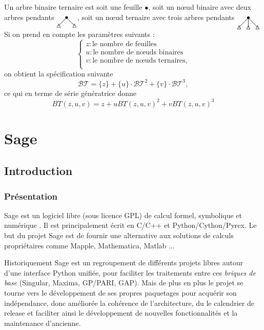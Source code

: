 \documentclass[12pt]{article}
\begin{document}
Un arbre binaire ternaire est soit une feuille $\bullet$, 
soit un nœud binaire avec deux arbres pendants $\xymatrix@R=5pt @C=5pt{& *={\bullet} \ar@{-}[dl]\ar@{-}[dr]& \\ *={\triangle}&&*={\triangle} } $,
soit un nœud ternaire avec trois arbres pendants $\xymatrix@R=10pt @C=10pt{& *={\bullet} \ar@{-}[dl]\ar@{-}[dr]\ar@{-}[d]& \\ *={\triangle}&*={\triangle}&*={\triangle} } $
Si on prend en compte les paramètres suivants :
$$\left\{
\begin{array}{l}
  z : \text{le nombre de feuilles}\\
  u : \text{le nombre de nœuds binaires}\\
  v : \text{le nombre de nœuds ternaires,}\\
\end{array}
$$
on obtient la spécification suivante
$$\mathcal{BT} = \{z\} + \{u\}\cdot\mathcal{BT}^2 + \{v\}\cdot\mathcal{BT}^3, $$
ce qui en terme de série génératrice donne 
$$BT(z,u,v) = z+uBT(z,u,v)^2+vBT(z,u,v)^3$$

\section{Sage}

\subsection{Introduction}

\subsubsection{Présentation}
Sage est un logiciel libre (sous licence GPL) de calcul formel, symbolique et
numérique \cite{sage}. Il est principalement écrit en C/C++ et Python/Cython/Pyrex. Le but
du projet Sage est de fournir une alternative aux solutions de calculs
propriétaires comme Mapple, Mathematica, Matlab ...


Historiquement Sage est un regroupement de différents projets libres autour
d'une interface Python unifiée, pour faciliter les traitements entre ces
\emph{briques de base} (Singular, Maxima, GP/PARI, GAP). Mais de plus en plus
le projet se tourne vers le développement de ses propres paquetages pour
acquérir son indépendance, donc améliorée la cohérence de l'architecture, 
du le calendrier de release et faciliter ainsi le développement de nouvelles
fonctionnalités et la maintenance d'ancienne.
\end{document}
